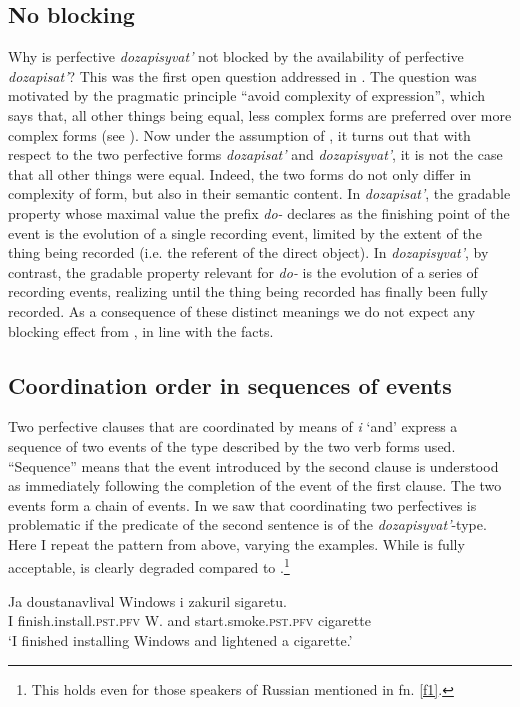 \documentclass[output=paper,
colorlinks,
citecolor=brown,
newtxmath
]{langscibook}
\begin{document}
\subsection{No blocking}
Why is perfective \textit{dozapisyvat'} not blocked by the availability of perfective \textit{dozapisat'}? This was the first open question addressed in . The question was motivated by the pragmatic principle ``avoid complexity of expression'', which says that, all other things being equal, less complex forms are preferred over more complex forms (see ). Now under the assumption of , it turns out that with respect to the two perfective forms \textit{dozapisat'} and \textit{dozapisyvat'}, it is not the case that all other things were equal. Indeed, the two forms do not only differ in complexity of form, but also in their semantic content. In \textit{dozapisat'}, the gradable property whose maximal value the prefix \textit{do-} declares as the finishing point of the event is the evolution of a single recording event, limited by the extent of the thing being recorded (i.e. the referent of the direct object). In \textit{dozapisyvat'}, by contrast, the gradable property relevant for \textit{do-} is the evolution of a series of recording events, realizing until the thing being recorded has finally been fully recorded. As a consequence of these distinct meanings we do not expect any blocking effect from , in line with the facts.

\subsection{Coordination order in sequences of events}
Two perfective clauses that are coordinated by means of \textit{i} `and' express a sequence of two events of the type described by the two verb forms used. ``Sequence'' means that the event introduced by the second clause is understood as immediately following the completion of the event of the first clause. The two events form a chain of events. In  we saw that coordinating two perfectives is problematic if the predicate of the second sentence is of the \textit{dozapisyvat'}-type. Here I repeat the pattern from above, varying the examples. While  is fully acceptable,  is clearly degraded compared to .\footnote{This holds even for those speakers of Russian mentioned in fn. \ref{f1}.}


\ea\label{123}
\gll Ja doustanavlival Windows i zakuril sigaretu.\\
I {finish.install.}\textsc{pst.pfv} W. and {start.smoke.}\textsc{pst.pfv} cigarette\\
\glt `I finished installing Windows and lightened a cigarette.'
\z
\end{document}
